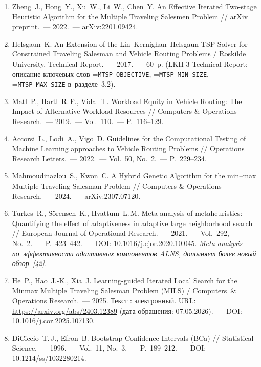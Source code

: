 \documentclass[a4paper,14pt]{extreport}
\makeatletter
\let\old@texttt\texttt
\renewcommand{\texttt}[1]{{\sloppy\hyphenchar\font=\m@ne\old@texttt{#1}}}
\makeatother
\begin{document}
\begin{enumerate}
\item Zheng~J., Hong~Y., Xu~W., Li~W., Chen~Y. An Effective Iterated Two-stage Heuristic Algorithm for the Multiple Traveling Salesmen Problem // arXiv preprint.~--- 2022.~--- arXiv:2201.09424.

\item Helsgaun~K. An Extension of the Lin--Kernighan--Helsgaun TSP Solver for Constrained Traveling Salesman and Vehicle Routing Problems / Roskilde University, Technical Report.~--- 2017.~--- 60~p. (LKH-3 Technical Report; описание ключевых слов \texttt{MTSP\_OBJECTIVE}, \texttt{MTSP\_MIN\_SIZE}, \texttt{MTSP\_MAX\_SIZE} в~разделе~3.2).

\item Matl~P., Hartl~R.\,F., Vidal~T. Workload Equity in Vehicle Routing: The Impact of Alternative Workload Resources // Computers \& Operations Research.~--- 2019.~--- Vol.~110.~--- P.~116--129.

\item Accorsi~L., Lodi~A., Vigo~D. Guidelines for the Computational Testing of Machine Learning approaches to Vehicle Routing Problems // Operations Research Letters.~--- 2022.~--- Vol.~50, No.~2.~--- P.~229--234.

\item Mahmoudinazlou~S., Kwon~C. A Hybrid Genetic Algorithm for the min--max Multiple Traveling Salesman Problem // Computers \& Operations Research.~--- 2024.~--- arXiv:2307.07120.

\item Turkes~R., Sörensen~K., Hvattum~L.\,M. Meta-analysis of metaheuristics: Quantifying the effect of adaptiveness in adaptive large neighborhood search // European Journal of Operational Research.~--- 2021.~--- Vol.~292, No.~2.~--- P.~423--442.~--- DOI: 10.1016/j.ejor.2020.10.045. \emph{Meta-analysis по~эффективности адаптивных компонентов ALNS, дополняет более новый обзор~[42].}

\item He~P., Hao~J.-K., Xia~J. Learning-guided Iterated Local Search for the Minmax Multiple Traveling Salesman Problem (MILS) / Computers~\& Operations Research.~--- 2025. Текст : электронный. URL: \url{https://arxiv.org/abs/2403.12389} (дата обращения: 07.05.2026).~--- DOI: 10.1016/j.cor.2025.107130.

\item DiCiccio~T.\,J., Efron~B. Bootstrap Confidence Intervals (BCa) // Statistical Science.~--- 1996.~--- Vol.~11, No.~3.~--- P.~189--212.~--- DOI: 10.1214/ss/1032280214.


\end{enumerate}
\end{document}
